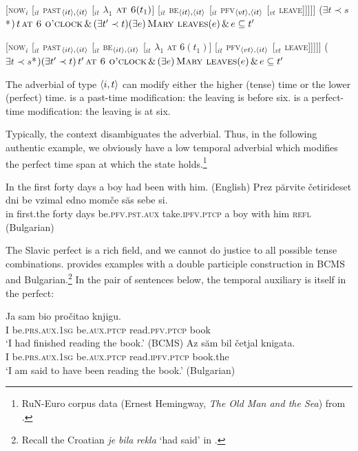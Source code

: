 \documentclass[output=paper,colorlinks,citecolor=brown]{langscibook}
\begin{document}
\ea
  \label{ex34a} {[}\textsc{now}$_{i}$ [$_{it}$ \textsc{past}$_{\langle{it}\rangle,\langle{it}\rangle}$ [$_{it}$ $\lambda_{1}$ $\textsc{at 6}(t_{1})$] [$_{it}$ \textsc{be}$_{\langle{it}\rangle,\langle{it}\rangle}$ 
[$_{it}$ \textsc{pfv}$_{\langle{vt}\rangle,\langle{it}\rangle}$ [$_{vt}$  \textsc{leave}]]]]] \newline
($\exists t \prec s$*$)\, t \, \textsc{at 6 o'clock} \, \& \, (\exists t' \prec t)(\exists e) \, \textsc{Mary 
leaves}(e) \, \& \, e \subseteq t' $
\z

\ea
  \label{ex34b} {[}\textsc{now}$_{i}$ [$_{it}$ \textsc{past}$_{\langle{it}\rangle,\langle{it}\rangle}$ [$_{it}$ \textsc{be}$_{\langle{it}\rangle,\langle{it}\rangle}$ [$_{it}$ $\lambda_{1}$ \textsc{at 6}$(t_{1})$] 
 [$_{it}$ \textsc{pfv}$_{\langle{vt}\rangle,\langle{it}\rangle}$ [$_{vt}$ \textsc{leave}]]]]] \newline
($\exists t \prec s$*$)(\exists t' \prec t)\, t' \, \textsc{at 6 o'clock} \, \& \, (\exists e) \, \textsc{Mary 
leaves}(e) \, \& \, e \subseteq t' $
\z

\noindent The adverbial of type $\langle{i,t}\rangle$ can modify either the higher (tense) time or the lower (perfect) time.
 is a past-time modification: the leaving is before six.  is a
perfect-time modification: the leaving is at six. 

Typically, the context disambiguates the adverbial. Thus, in the following authentic example, 
we obviously have a low temporal adverbial which modifies the perfect time span at which the state holds.\footnote{RuN-Euro corpus data \citep{run} (Ernest Hemingway, \textit{The Old Man and the Sea}) from \citet{gronn_stechow2020}.}

\ea\ea \label{forty}   In the first forty days a boy  had been  with him. \hfill (English)
\ex\gll Prez părvite četirideset dni be vzimal edno momče săs sebe si. \\
in first.the forty days be.\textsc{pfv}.\textsc{pst}.\textsc{aux} take.\textsc{ipfv}.\textsc{ptcp} a boy with him \textsc{refl} \\
\hfill (Bulgarian)
\z\z

\noindent The Slavic perfect is a rich field, and we cannot do justice to all possible tense combinations. \citet[98]{Migdalski2006} provides examples with a 
 double participle construction in BCMS and
Bulgarian.\footnote{Recall the Croatian \textit{je} \textit{bila} \textit{rekla} `had said' in .} In the pair of sentences below, the temporal auxiliary is itself in the perfect:

\ea\ea\label{double}\gll
Ja sam bio pročitao knjigu.\\ 
I be.\textsc{prs}.\textsc{aux.1sg} be.\textsc{aux}.\textsc{ptcp}  read.\textsc{pfv}.\textsc{ptcp}  book  \\
\glt
`I had finished reading the book.' \hfill (BCMS)
\ex\label{evdouble}\gll
Az săm bil četjal knigata.\\ 
I be.\textsc{prs}.\textsc{aux.1sg} be.\textsc{aux}.\textsc{ptcp}  read.\textsc{ipfv}.\textsc{ptcp}   book.the \\ \glt
`I am said to have been reading the book.' \hfill (Bulgarian) 
\z\z
\end{document}
